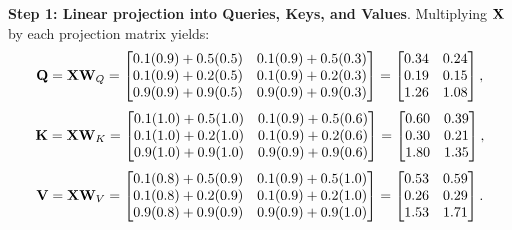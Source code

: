 \documentclass[../../../main.tex]{subfiles}
\begin{document}
\noindent\textbf{Step 1: Linear projection into Queries, Keys, and Values}.\newline
Multiplying $\mathbf{X}$ by each projection matrix yields:
\begin{equation}
\mathbf{Q} = \mathbf{X} \mathbf{W}_Q = \begin{bmatrix}
0.1(0.9) + 0.5(0.5) & 0.1(0.9) + 0.5(0.3) \\
0.1(0.9) + 0.2(0.5) & 0.1(0.9) + 0.2(0.3) \\
0.9(0.9) + 0.9(0.5) & 0.9(0.9) + 0.9(0.3)
\end{bmatrix} = \begin{bmatrix}
0.34 & 0.24 \\
0.19 & 0.15 \\
1.26 & 1.08
\end{bmatrix},
\end{equation}
\begin{equation}
\mathbf{K} = \mathbf{X} \mathbf{W}_K = \begin{bmatrix}
0.1(1.0) + 0.5(1.0) & 0.1(0.9) + 0.5(0.6) \\
0.1(1.0) + 0.2(1.0) & 0.1(0.9) + 0.2(0.6) \\
0.9(1.0) + 0.9(1.0) & 0.9(0.9) + 0.9(0.6)
\end{bmatrix} = \begin{bmatrix}
0.60 & 0.39 \\
0.30 & 0.21 \\
1.80 & 1.35
\end{bmatrix},
\end{equation}
\begin{equation}
\mathbf{V} = \mathbf{X} \mathbf{W}_V = \begin{bmatrix}
0.1(0.8) + 0.5(0.9) & 0.1(0.9) + 0.5(1.0) \\
0.1(0.8) + 0.2(0.9) & 0.1(0.9) + 0.2(1.0) \\
0.9(0.8) + 0.9(0.9) & 0.9(0.9) + 0.9(1.0)
\end{bmatrix} = \begin{bmatrix}
0.53 & 0.59 \\
0.26 & 0.29 \\
1.53 & 1.71
\end{bmatrix}.
\end{equation}
\end{document}
